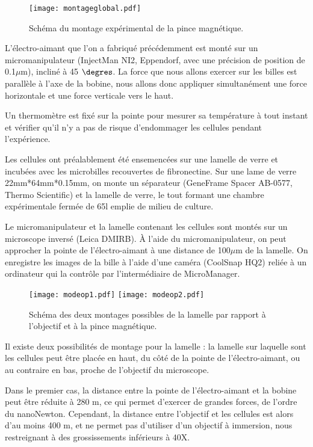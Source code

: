 		 \begin{figure}
		 \texttt{[image: montageglobal.pdf]}
		 \caption{Schéma du montage expérimental de la pince magnétique.\label{montage global}}
		 
		 \end{figure}


		 
		 L'électro-aimant que l'on a fabriqué précédemment est monté sur un micromanipulateur (InjectMan NI2, Eppendorf, avec une précision de position de 0.1$\mu$m), incliné à 45 $\degres$. La force que nous allons exercer sur les billes est parallèle à l'axe de la bobine, nous allons donc appliquer simultanément une force horizontale et une force verticale vers le haut. 
		 
		 Un thermomètre est fixé sur la pointe pour mesurer sa température à tout instant et vérifier qu'il n'y a pas de risque d'endommager les cellules pendant l'expérience. 
		 
		 Les cellules ont préalablement été ensemencées sur une lamelle de verre et incubées avec les microbilles recouvertes de fibronectine. Sur une lame de verre 22mm*64mm*0.15mm, on monte un séparateur (GeneFrame Spacer AB-0577, Thermo Scientific) et la lamelle de verre, le tout formant une chambre expérimentale fermée de 65\micro l emplie de milieu de culture. 		 
		 
		 Le micromanipulateur et la lamelle contenant les cellules sont montés sur un microscope inversé (Leica DMIRB). \`A l'aide du micromanipulateur, on peut approcher la pointe de l'électro-aimant à une distance de 100$\mu$m de la lamelle. On enregistre les images de la bille à l'aide d'une caméra (CoolSnap HQ2) reliée à un ordinateur qui la contrôle par l'intermédiaire de MicroManager. 
		 
		 \begin{figure}
		 \texttt{[image: modeop1.pdf]}
		 \texttt{[image: modeop2.pdf]}
		 \caption{Schéma des deux montages possibles de la lamelle par rapport à l'objectif et à la pince magnétique.}
		 \end{figure}
		 
		 Il existe deux possibilités de montage pour la lamelle : la lamelle sur laquelle sont les cellules peut être placée en haut, du côté de la pointe de l'électro-aimant, ou au contraire en bas, proche de l'objectif du microscope. 
		 
		 Dans le premier cas, la distance entre la pointe de l'électro-aimant et la bobine peut être réduite à 280 \micro m, ce qui permet d'exercer de grandes forces, de l'ordre du nanoNewton. Cependant, la distance entre l'objectif et les cellules est alors d'au moins 400 \micro m, et ne permet pas d'utiliser d'un objectif à immersion, nous restreignant à des grossissements inférieurs à 40X. 

